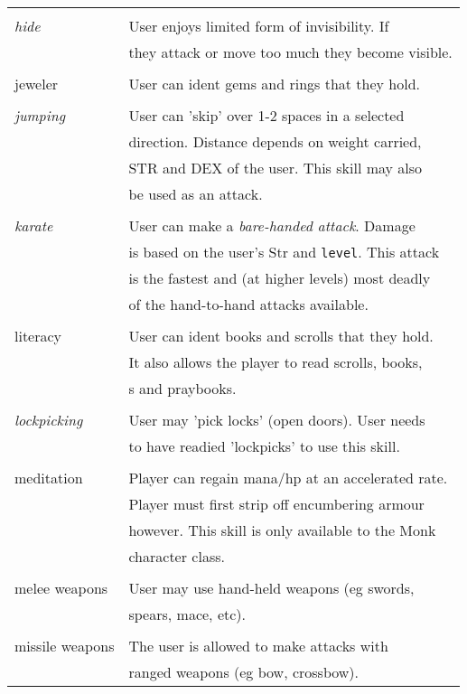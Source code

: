 \begin{longtable}{|p{4cm}|p{9cm}|}
 &  \\
{\em hide}	& User enjoys limited form of invisibility. If \\
		& they attack or move too much they become visible. \\
 & \\
jeweler		& User can ident gems and rings that they hold. \\
 & \\
{\em jumping}	& User can 'skip' over 1-2 spaces in a selected \\
		& direction. Distance depends on weight carried, \\
		& STR and DEX of the user. This skill may also \\
		& be used as an attack. \\
 & \\
{\em karate}	& User can make a {\em bare-handed attack}. Damage \\
		& is based on the user's Str and {\tt level}. This attack \\
		& is the fastest and (at higher levels) most deadly \\
		& of the hand-to-hand attacks available. \\
 & \\
literacy	& User can ident books and scrolls that they hold. \\
		& It also allows the player to read scrolls, books, \\
		& \wizbook s and praybooks. \\
 & \\
{\em lockpicking} & User may 'pick locks' (open doors). User needs \\
		& to have readied 'lockpicks' to use this skill. \\
 & \\
meditation	& Player can regain mana/hp at an accelerated rate. \\
		& Player must first strip off encumbering armour \\
		& however. This skill is only available to the Monk \\
		& character class. \\
 & \\
melee weapons	& User may use hand-held weapons (eg swords, \\
		& spears, mace, etc). \\
 & \\
missile weapons	& The user is allowed to make attacks with \\
		& ranged weapons (eg bow, crossbow). \\

\end{longtable}
